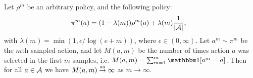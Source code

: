         \begin{lemma} \label{lem:inf_often_action_select}
            Let $\rho^m$ be an arbitrary policy, and the following policy: 
            \begin{align} 
                \pi^m(a)=(1-\lambda(m))\rho^m(a) + \lambda(m) \frac{1}{|\mathcal{A}|}, \label{appeq:ioas_policy}
            \end{align} 
            with $\lambda(m)=\min(1,\epsilon/\log(e+m))$, where $\epsilon\in(0,\infty)$. Let $a^m\sim \pi^m$ be the $m$th sampled action, and let $M(a,m)$ be the number of times action $a$ was selected in the first $m$ samples, i.e. $M(a,m)=\sum_{m=1}^m \one[a^m=a]$. Then for all $a\in\mathcal{A}$ we have $M(a,m)\overset{as}{\to}\infty$ as $m\rightarrow \infty$.
        \end{lemma}
